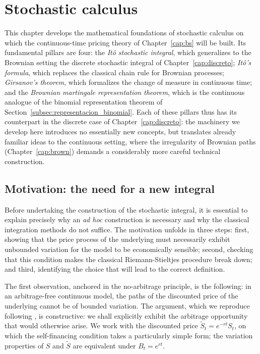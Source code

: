 \documentclass[11pt,a4paper,oneside]{report}
\theoremstyle{plain}
\theoremstyle{definition}
\theoremstyle{remark}
\newcommand{\1}{\mathbf{1}}
\begin{document}
\chapter{Stochastic calculus}\label{cap:itocalculus}

This chapter develops the mathematical foundations of stochastic
calculus on which the continuous-time pricing theory of
Chapter~\ref{cap:bs} will be built. Its fundamental pillars are four:
the \emph{Itô stochastic integral}, which generalizes to the Brownian
setting the discrete stochastic integral of Chapter~\ref{cap:discreto};
\emph{Itô's formula}, which replaces the classical chain rule for
Brownian processes; \emph{Girsanov's theorem}, which formalizes the
change of measure in continuous time; and the \emph{Brownian
martingale representation theorem}, which is the continuous analogue
of the binomial representation theorem of
Section~\ref{subsec:representacion_binomial}. Each of these pillars
thus has its counterpart in the discrete case of
Chapter~\ref{cap:discreto}: the machinery we develop here introduces
no essentially new concepts, but translates already familiar ideas to
the continuous setting, where the irregularity of Brownian paths
(Chapter~\ref{cap:brown}) demands a considerably more careful
technical construction.

\section{Motivation: the need for a new integral}
\label{sec:motivacion_ito}

Before undertaking the construction of the stochastic integral, it is
essential to explain precisely why an \emph{ad hoc} construction is
necessary and why the classical integration methods do not suffice.
The motivation unfolds in three steps: first, showing that the price
process of the underlying must necessarily exhibit unbounded variation
for the model to be economically sensible; second, checking that this
condition makes the classical Riemann-Stieltjes procedure break down;
and third, identifying the choice that will lead to the correct
definition.

The first observation, anchored in the no-arbitrage
principle, is the following: in an arbitrage-free continuous model,
the paths of the discounted price of the underlying cannot be of
bounded variation. The argument, which we reproduce following
\cite{etheridge}, is constructive: we shall explicitly exhibit the
arbitrage opportunity that would otherwise arise. We work with the
discounted price $\widetilde S_t = e^{-rt} S_t$, on which the
self-financing condition takes a particularly simple form; the
variation properties of $S$ and $\widetilde S$ are equivalent under
$B_t = e^{rt}$.
\end{document}
